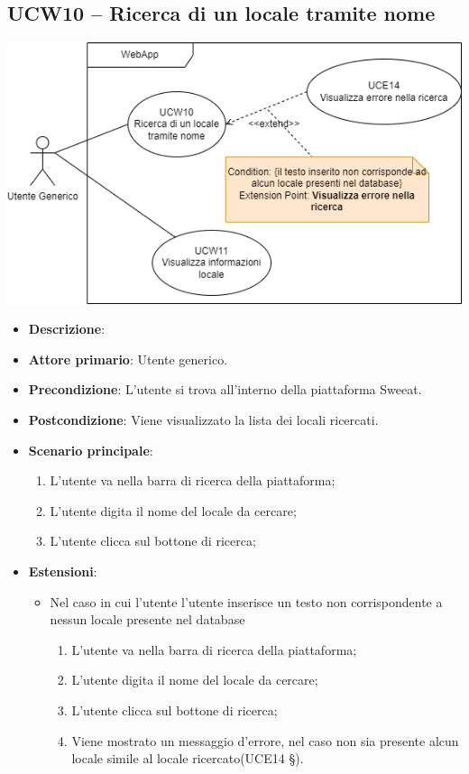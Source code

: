 \subsection{UCW10 – Ricerca di un locale tramite nome}
\begin{center}
\includegraphics[scale=0.5]{UC_images/UCW10-11.png} 
\end{center}
\begin{itemize}
    \item \textbf{Descrizione}:
    \item \textbf{Attore primario}: Utente generico.
    \item \textbf{Precondizione}: L'utente si trova all’interno della piattaforma Sweeat.
    \item \textbf{Postcondizione}: Viene visualizzato la lista dei locali ricercati.
    \item \textbf{Scenario principale}: 
    \begin{enumerate}
        \item L’utente va nella barra di ricerca della piattaforma;
        \item L’utente digita il nome del locale da cercare;
        \item L’utente clicca sul bottone di ricerca;
    \end{enumerate}
    \item \textbf{Estensioni}:
    \begin{itemize}
        \item Nel caso in cui l’utente l’utente inserisce un testo non corrispondente a nessun locale presente nel database
	\begin{enumerate}  
		\item L’utente va nella barra di ricerca della piattaforma;
        \item L’utente digita il nome del locale da cercare;
        \item L’utente clicca sul bottone di ricerca; 
        \item Viene mostrato un messaggio d'errore, nel caso non sia presente alcun locale simile al locale ricercato(UCE14 §).
    \end{enumerate}
    \end{itemize}    
\end{itemize}

